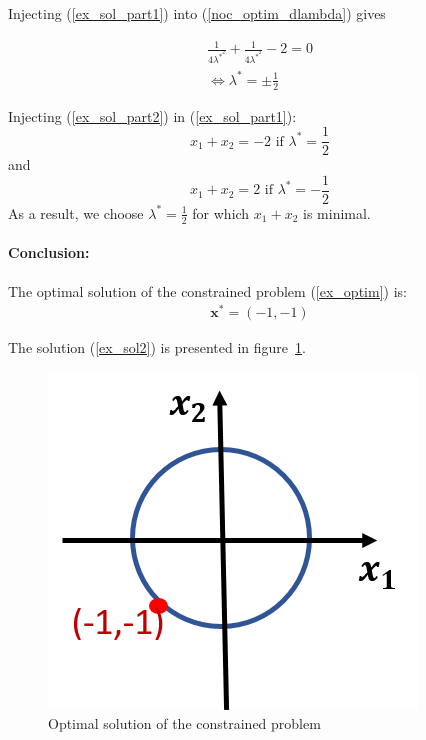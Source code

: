 ﻿\documentclass[twoside]{article}
\begin{document}
Injecting (\ref{ex_sol_part1}) into (\ref{noc_optim_dlambda}) gives 

\begin{equation} \label{ex_sol_part2}
    \begin{array}{c}
       \frac{1}{4 \lambda^*^2} + \frac{1}{4 \lambda^*^2} - 2 = 0 \\
        \iff \lambda^* = \pm \frac{1}{2}
    \end{array}
\end{equation}

Injecting (\ref{ex_sol_part2}) in (\ref{ex_sol_part1}): \\
\[x_1 + x_2 = -2 \text{ if } \lambda^* = \frac{1}{2} \] and
\[x_1 + x_2 = 2 \text{ if } \lambda^* = -\frac{1}{2} \] As a result, we choose $\lambda^* = \frac{1}{2} $ for which $x_1 + x_2$ is minimal.

\paragraph{Conclusion:} The optimal solution of the constrained problem (\ref{ex_optim}) is:
\begin{equation}\label{ex_sol2}
    \begin{array}{c}
    \mathbf{x}^* = (-1, -1)
    \end{array}
\end{equation}

The solution (\ref{ex_sol2}) is presented in figure~\ref{fig:ex_sol}.

\begin{figure}[ht]
    \centering
    \includegraphics[scale = 0.7]{Constrainted_Optim2.png}
    \caption{Optimal solution of the constrained problem}
    \label{fig:ex_sol}
\end{figure}
\end{document}
